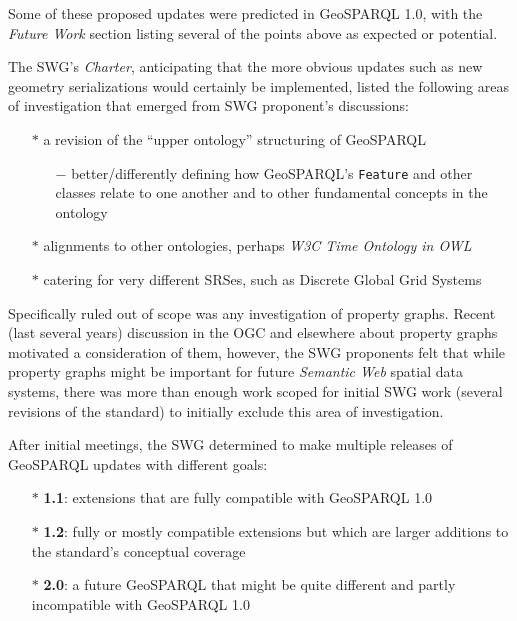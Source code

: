 \documentclass[runningheads]{llncs}
\begin{document}
Some of these proposed updates were predicted in GeoSPARQL 1.0, with the \textit{Future Work} section listing several of the 
points above as expected or potential.

The SWG's \textit{Charter}, anticipating that the more obvious updates such as new geometry serializations would certainly
be implemented, listed the following areas of investigation that emerged from SWG proponent's discussions:

\begin{itemize}
    \item[$\ast$] a revision of the ``upper ontology'' structuring of GeoSPARQL
    \begin{itemize}
        \item[$-$] better/differently defining how GeoSPARQL's \texttt{Feature} and other classes relate to one another and to other fundamental concepts in the ontology
    \end{itemize} 
    \item[$\ast$] alignments to other ontologies, perhaps \textit{W3C Time Ontology in OWL}~\cite{simon_cox_time_2017}
    \item[$\ast$] catering for very different SRSes, such as Discrete Global Grid Systems
\end{itemize}

Specifically ruled out of scope was any investigation of property graphs. Recent (last several years) discussion in the OGC and 
elsewhere about property graphs motivated a consideration of them, however, the SWG proponents felt that while property graphs might 
be important for future \textit{Semantic Web} spatial data systems, there was more than enough work scoped for initial SWG work
(several revisions of the standard) to initially exclude this area of investigation.

After initial meetings, the SWG determined to make multiple releases of GeoSPARQL updates with different goals:

\begin{itemize}
    \item[$\ast$] \textbf{1.1}: extensions that are fully compatible with GeoSPARQL 1.0
    \item[$\ast$] \textbf{1.2}: fully or mostly compatible extensions but which are larger additions to the standard's conceptual coverage
    \item[$\ast$] \textbf{2.0}: a future GeoSPARQL that might be quite different and partly incompatible with GeoSPARQL 1.0
\end{itemize} 
\end{document}

